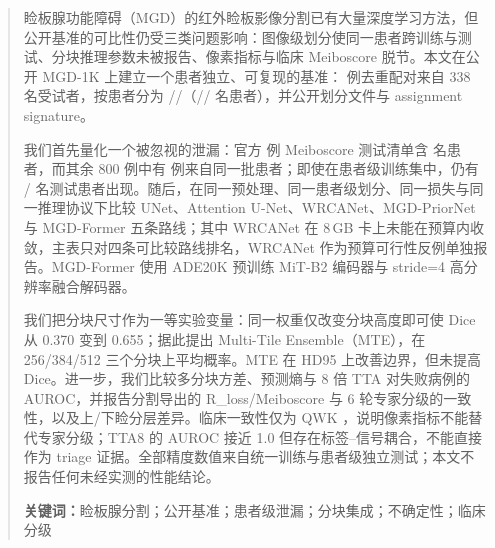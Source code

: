 \begin{abstract}
睑板腺功能障碍（MGD）的红外睑板影像分割已有大量深度学习方法，但公开基准的可比性仍受三类问题影响：图像级划分使同一患者跨训练与测试、分块推理参数未被报告、像素指标与临床 Meiboscore 脱节。本文在公开 MGD-1K 上建立一个患者独立、可复现的基准：\nTotal{} 例去重配对来自 338 名受试者，按患者分为 \nTrain/\nVal/\nTest{}（\nTrainPatients/\nValPatients/\nTestPatients{} 名患者），并公开划分文件与 assignment signature。

我们首先量化一个被忽视的泄漏：官方 \officialTestImages{} 例 Meiboscore 测试清单含 \officialTestPatients{} 名患者，而其余 800 例中有 \officialLeakImages{} 例来自同一批患者；即使在患者级训练集中，仍有 \officialLeakPatients/\officialTestPatients{} 名测试患者出现。随后，在同一预处理、同一患者级划分、同一损失与同一推理协议下比较 UNet、Attention U-Net、WRCANet、MGD-PriorNet 与 MGD-Former 五条路线；其中 WRCANet 在 8\,GB 卡上未能在预算内收敛，主表只对四条可比较路线排名，WRCANet 作为预算可行性反例单独报告。MGD-Former 使用 ADE20K 预训练 MiT-B2 编码器与 stride=4 高分辨率融合解码器。

我们把分块尺寸作为一等实验变量：同一权重仅改变分块高度即可使 Dice 从 0.370 变到 0.655；据此提出 Multi-Tile Ensemble（MTE），在 256/384/512 三个分块上平均概率。MTE 在 HD95 上改善边界，但未提高 Dice。进一步，我们比较多分块方差、预测熵与 8 倍 TTA 对失败病例的 AUROC，并报告分割导出的 R\_loss/Meiboscore 与 6 轮专家分级的一致性，以及上/下睑分层差异。临床一致性仅为 QWK \qwkMF，说明像素指标不能替代专家分级；TTA8 的 AUROC 接近 1.0 但存在标签--信号耦合，不能直接作为 triage 证据。全部精度数值来自统一训练与患者级独立测试；本文不报告任何未经实测的性能结论。

\vspace{0.6em}
\noindent\textbf{关键词：}睑板腺分割；公开基准；患者级泄漏；分块集成；不确定性；临床分级
\end{abstract}
